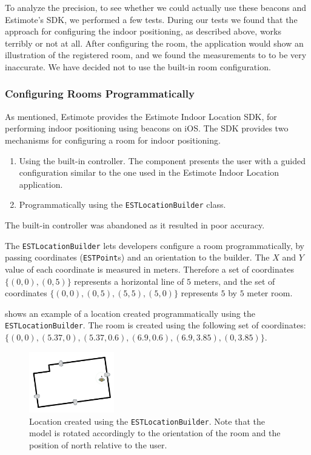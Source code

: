 To analyze the precision, 
to see whether we could actually use these beacons and Estimote's SDK, 
we performed a few tests. 
During our tests we found that the approach for configuring the indoor positioning, 
as described above, works terribly or not at all. 
After configuring the room, 
the application would show an illustration of the registered room, 
and we found the measurements to to be very inaccurate.
We have decided not to use the built-in room configuration. 

\subsubsection{Configuring Rooms Programmatically}
As mentioned, Estimote provides the Estimote Indoor Location SDK, 
for performing indoor positioning using beacons on iOS. 
The SDK provides two mechanisms for configuring a room for indoor positioning.

\begin{enumerate}
\item Using the built-in controller. The component presents the user with a guided configuration similar to the one used in the Estimote Indoor Location application.
\item Programmatically using the \texttt{ESTLocationBuilder} class.
\end{enumerate}

The built-in controller was abandoned as it resulted in poor accuracy.

The \texttt{ESTLocationBuilder} lets developers configure a room programmatically, 
by passing coordinates (\texttt{ESTPoint}s) and an orientation to the builder. 
The $X$ and $Y$ value of each coordinate is measured in meters. 
Therefore a set of coordinates $\{(0, 0), (0, 5)\}$ represents a horizontal line of $5$ meters, 
and the set of coordinates $\{(0,0),(0,5),(5,5),(5,0)\}$ represents $5$ by $5$ meter room.

 shows an example of a location created programmatically using the \texttt{ESTLocationBuilder}. The room is created using the following set of coordinates: $\{(0, 0), (5.37, 0), (5.37, 0.6), (6.9, 0.6), (6.9, 3.85), (0, 3.85)\}$.

\begin{figure}[!htb]
  \centering
  \includegraphics[width=0.33\textwidth]{images/living-room}
  \caption{Location created using the \texttt{ESTLocationBuilder}. Note that the model is rotated accordingly to the orientation of the room and the position of north relative to the user.}
  \label{fig:estlocationbuilder-livingroom}
\end{figure}

